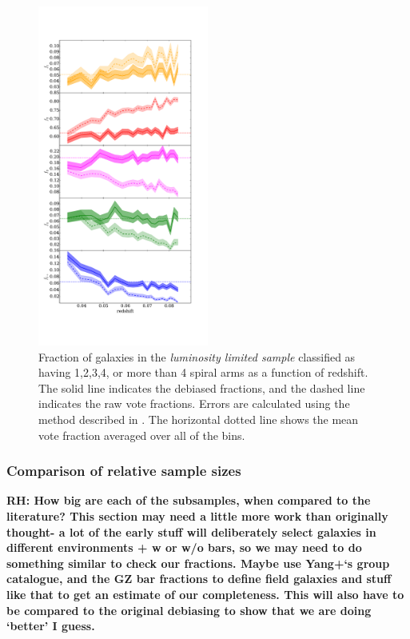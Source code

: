 \documentclass[useAMS,usenatbib]{mn2e}
\newcommand{\rh}[1]{{\bf \textcolor{RoyalPurple}{RH: #1}}}
\begin{document}
\begin{figure}
		\centering

        \includegraphics[width=0.5\textwidth]{Images/Results/sample_fractions.pdf}

        \caption{Fraction of galaxies in the \textit{luminosity limited sample} classified as having 1,2,3,4, or more than 4 spiral arms as a function of redshift. The solid line indicates the debiased fractions, and the dashed line indicates the raw vote fractions. Errors are calculated using the method described in \citet{Cameron_11}. The horizontal dotted line shows the mean vote fraction averaged over all of the bins.}

        \label{fig:arm_number_trend}

\end{figure}

\subsubsection{Comparison of relative sample sizes}

\rh{How big are each of the subsamples, when compared to the literature? This section may need a little more work than originally thought- a lot of the early stuff will deliberately select galaxies in different environments + w or w/o bars, so we may need to do something similar to check our fractions. Maybe use Yang+`s group catalogue, and the GZ bar fractions to define field galaxies and stuff like that to get an estimate of our completeness. This will also have to be compared to the original debiasing to show that we are doing `better' I guess.}
\end{document}
